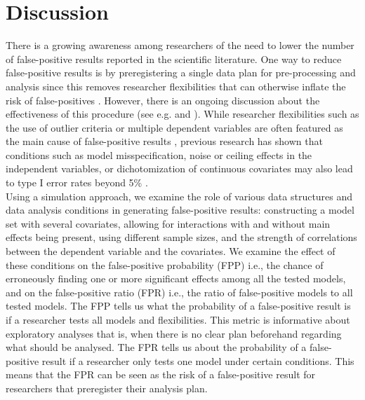 \section{Discussion}
There is a growing awareness among researchers of the need to lower the number of false-positive results reported in the scientific literature. One way to reduce false-positive results is by preregistering a single data plan for pre-processing and analysis since this removes researcher flexibilities that can otherwise inflate the risk of false-positives \citep{simmons2018}. However, there is an ongoing discussion about the effectiveness of this procedure (see e.g. \cite{Pham2020} and \cite{Simmons2020}). While researcher flexibilities such as the use of outlier criteria or multiple dependent variables are often featured as the main cause of false-positive results \citep{John2012}, previous research has shown that conditions such as model misspecification, noise or ceiling effects in the independent variables, or dichotomization of continuous covariates may also lead to type I error rates beyond 5\% \citep{Dennis2019, Brunner2009, Austin2003, Austin2004,Litiere07}. \\

Using a simulation approach, we examine the role of various data structures and data analysis conditions in generating false-positive results: constructing a model set with several covariates, allowing for interactions with and without main effects being present, using different sample sizes, and the strength of correlations between the dependent variable and the covariates. We examine the effect of these conditions on the false-positive probability (FPP) i.e., the chance of erroneously finding one or more significant effects among all the tested models, and on the false-positive ratio (FPR) i.e., the ratio of false-positive models to all tested models. The FPP tells us what the probability of a false-positive result is if a researcher tests all models and flexibilities. This metric is informative about exploratory analyses that is, when there is no clear plan beforehand regarding what should be analysed. The FPR tells us about the probability of a false-positive result if a researcher only tests one model under certain conditions. This means that the FPR can be seen as the risk of a false-positive result for researchers that preregister their analysis plan. \\


